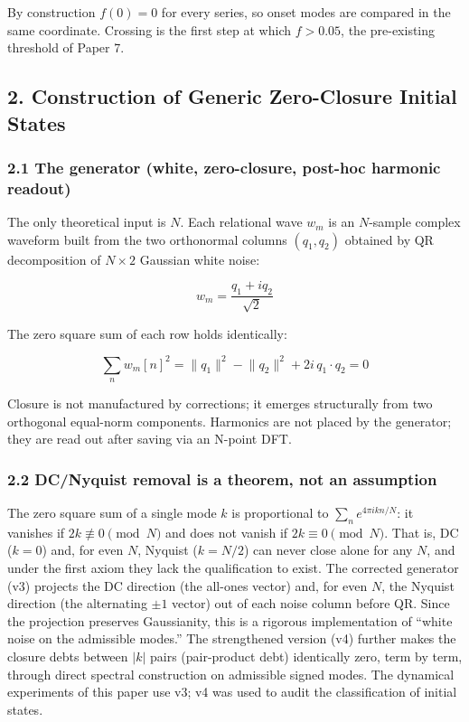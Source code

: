\documentclass[
  a4paper,
]{article}
\begin{document}
By construction \(f(0)=0\) for every series, so onset modes are compared
in the same coordinate. Crossing is the first step at which \(f>0.05\),
the pre-existing threshold of Paper 7.

\subsection{2. Construction of Generic Zero-Closure Initial
States}\label{construction-of-generic-zero-closure-initial-states}

\subsubsection{2.1 The generator (white, zero-closure, post-hoc harmonic
readout)}\label{the-generator-white-zero-closure-post-hoc-harmonic-readout}

The only theoretical input is \(N\). Each relational wave \(w_m\) is an
\(N\)-sample complex waveform built from the two orthonormal columns
\((q_1,q_2)\) obtained by QR decomposition of \(N\times2\) Gaussian
white noise:

\[w_m=\frac{q_1+iq_2}{\sqrt2}\]

The zero square sum of each row holds identically:

\[\sum_n w_m[n]^2=\lVert q_1\rVert^2-\lVert q_2\rVert^2+2i\,q_1\!\cdot\!q_2=0\]

Closure is not manufactured by corrections; it emerges structurally from
two orthogonal equal-norm components. Harmonics are not placed by the
generator; they are read out after saving via an N-point DFT.

\subsubsection{2.2 DC/Nyquist removal is a theorem, not an
assumption}\label{dcnyquist-removal-is-a-theorem-not-an-assumption}

The zero square sum of a single mode \(k\) is proportional to
\(\sum_n e^{4\pi ikn/N}\): it vanishes if \(2k\not\equiv0\pmod N\) and
does not vanish if \(2k\equiv0\pmod N\). That is, DC (\(k=0\)) and, for
even \(N\), Nyquist (\(k=N/2\)) can never close alone for any \(N\), and
under the first axiom they lack the qualification to exist. The
corrected generator (v3) projects the DC direction (the all-ones vector)
and, for even \(N\), the Nyquist direction (the alternating \(\pm1\)
vector) out of each noise column before QR. Since the projection
preserves Gaussianity, this is a rigorous implementation of ``white
noise on the admissible modes.'' The strengthened version (v4) further
makes the closure debts between \(|k|\) pairs (pair-product debt)
identically zero, term by term, through direct spectral construction on
admissible signed modes. The dynamical experiments of this paper use v3;
v4 was used to audit the classification of initial states.
\end{document}
